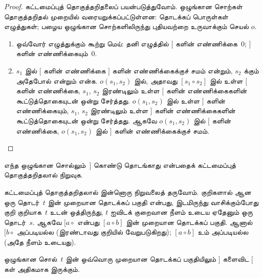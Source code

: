\documentclass[../../../include/open-logic-section]{subfiles}
\begin{document}
\begin{proof}
கட்டமைப்புத் தொகுத்தறிதலைப் பயன்படுத்துவோம்.
ஒழுங்கான சொற்கள் தொகுத்தறிதல் முறையில்
வரையறுக்கப்பட்டுள்ளன: தொடக்கப் பொருள்கள்
எழுத்துகள்; பழைய ஒழுங்கான சொற்களிலிருந்து
புதியவற்றை உருவாக்கும் செயல் $o$.
\begin{enumerate}
\item ஒவ்வோர் எழுத்துக்கும் கூற்று மெய்:
  தனி எழுத்தில் $[$ களின் எண்ணிக்கை~$0$;
  $]$ களின் எண்ணிக்கையும்~$0$.
\item $s_1$ இல் $[$ களின் எண்ணிக்கை
  $]$ களின் எண்ணிக்கைக்குச் சமம் என்றும்,
  $s_2$ க்கும் அதேபோல் என்றும் என்க.
  $o(s_1, s_2)$ இல், அதாவது
  $[s_1 \circ s_2]$ இல் உள்ள $[$ களின்
  எண்ணிக்கை, $s_1$, $s_2$ இரண்டிலும் உள்ள
  $[$ களின் எண்ணிக்கைகளின் கூட்டுத்தொகையுடன்
  ஒன்று சேர்த்தது. $o(s_1, s_2)$ இல் உள்ள
  $]$ களின் எண்ணிக்கையும், $s_1$, $s_2$
  இரண்டிலும் உள்ள $]$ களின் எண்ணிக்கைகளின்
  கூட்டுத்தொகையுடன் ஒன்று சேர்த்தது. ஆகவே
  $o(s_1, s_2)$ இல் $[$ களின் எண்ணிக்கை,
  $o(s_1,s_2)$ இல் $]$ களின் எண்ணிக்கைக்குச்
  சமம்.
\end{enumerate}
\end{proof}

\begin{prob}
  எந்த ஒழுங்கான சொல்லும்~$]$ கொண்டு
  தொடங்காது என்பதைக் கட்டமைப்புத்
  தொகுத்தறிதலால் நிறுவுக.
\end{prob}

கட்டமைப்புத் தொகுத்தறிதலால் இன்னொரு நிறுவலைத்
தருவோம். குறிகளால் ஆன ஒரு தொடர்~$t$ இன்
முறையான தொடக்கப் பகுதி என்பது,
இடமிருந்து வாசிக்கும்போது குறி குறியாக~$t$
உடன் ஒத்திருந்து, $t$ ஐவிடக் குறைவான
நீளம் உடைய ஏதேனும் ஒரு தொடர்~$s$.
ஆகவே $[a \circ {}$ என்பது $[a \circ b]$
இன் முறையான தொடக்கப் பகுதி. ஆனால்
$[b \circ {}$ அப்படியல்ல (இரண்டாவது
குறியில் வேறுபடுகிறது); $[a \circ b]$
உம் அப்படியல்ல (அதே நீளம் உடையது).

\begin{prop}
  ஒழுங்கான சொல்~$t$ இன் ஒவ்வொரு முறையான
  தொடக்கப் பகுதியிலும் $]$ களைவிட $[$
  கள் அதிகமாக இருக்கும்.
\end{prop}
\end{document}
